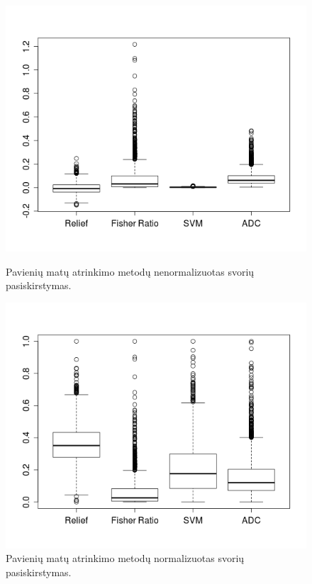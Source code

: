 \begin{figure}[ht]
\begin{minipage}[b]{0.5\linewidth}
\centering
\includegraphics[width=1\textwidth]{../bachelor/images/boxplot_colon_all.png}
\caption{Pavienių matų atrinkimo metodų nenormalizuotas svorių pasiskirstymas.}
\label{fig:figure1}
\end{minipage}
\hspace{0.5cm}
\begin{minipage}[b]{0.5\linewidth}
\centering
\includegraphics[width=1\textwidth]{../bachelor/images/boxplot_colon_all_normalized.png}
\caption{Pavienių matų atrinkimo metodų normalizuotas svorių pasiskirstymas.}
\label{fig:figure2}
\end{minipage}
\end{figure}

